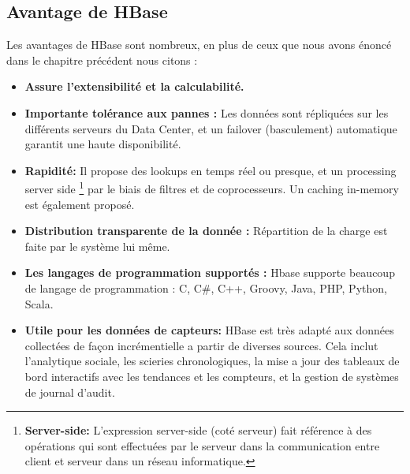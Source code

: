 \subsection{Avantage de HBase}
Les avantages de HBase sont nombreux, en plus de ceux que nous avons énoncé dans
le chapitre précédent nous citons :

\begin{itemize}[label=\textbullet]

\item \textbf{Assure l'extensibilité et la calculabilité.} 

\item \textbf{Importante tolérance aux pannes :} Les données sont répliquées sur les différents serveurs du Data Center, et un failover (basculement) automatique garantit une haute disponibilité.

\item \textbf{Rapidité:} Il propose des lookups en temps réel ou presque, et un processing server side \footnote{\textbf{Server-side:} L'expression server-side (coté serveur) fait référence à des opérations qui sont effectuées par le serveur dans la communication entre client et serveur dans un réseau informatique.} par le biais de filtres et de coprocesseurs. Un caching in-memory est également proposé.

\item \textbf{Distribution transparente de la donnée :} Répartition de la charge est faite par le système lui même.

\item \textbf{Les langages de programmation supportés :} Hbase supporte beaucoup de langage de programmation : C, C\#, C++, Groovy, Java, PHP, Python, Scala.

\item \textbf{Utile pour les données de capteurs:} HBase est très adapté aux données collectées de façon incrémentielle a partir de diverses sources. Cela inclut l'analytique sociale, les scieries chronologiques, la mise a jour des tableaux de bord interactifs avec les tendances et les compteurs, et la gestion de systèmes de journal d'audit.

\end{itemize}